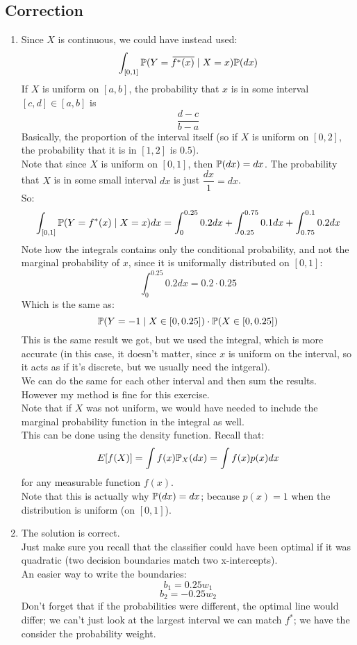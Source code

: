 \documentclass[12pt]{article}
\begin{document}
\begingroup
\color{red}
\subsection*{Correction}
\begin{enumerate}[label=\alph*)]
    \item
    Since $X$ is continuous,
    we could have instead used:
    \[ \int_{[0, 1]} 
    \mathbb{P}(Y = \,\overline{\!{f^*(x)}} \mid X = x) \mathbb{P}(dx) \]
    If $X$ is uniform on $[a, b]$, the probability that
    $x$ is in some interval $[c, d] \in [a, b]$ is
    \[ \dfrac{d-c}{b-a} \]
    Basically, the proportion of the interval itself
    (so if $X$ is uniform on $[0, 2]$,
    the probability that it is in $[1, 2]$
    is $0.5$). \\
    Note that since $X$ is uniform on $[0, 1]$,
    then $\mathbb{P}(dx) = dx$.
    The probability that $X$ is in some small interval $dx$
    is just $\dfrac{dx}{1} = dx$. \\
    So:
    \[ \int_{[0, 1]} 
    \mathbb{P}(Y = f^*(x) \mid X = x) dx =
    \int_0^{0.25} 0.2 dx
    + \int_{0.25}^{0.75} 0.1 dx
    +\int_{0.75}^{0.1} 0.2 dx \]
    Note how the integrals contains
    only the conditional probability,
    and not the marginal probability of $x$,
    since it is uniformally distributed
    on $[0, 1]$:
    \[ \int_0^{0.25} 0.2 dx = 0.2 \cdot 0.25 \]
    Which is the same as:
    \[ \mathbb{P}(Y = -1 \mid X \in [0, 0.25]) 
    \cdot \mathbb{P}(X \in [0, 0.25]) \]
    This is the same result we got,
    but we used the integral, which is more accurate
    (in this case, it doesn't matter,
    since $x$ is uniform on the interval,
    so it acts as if it's discrete,
    but we usually need the intgeral). \\
    We can do the same for each other interval
    and then sum the results. \\
    However my method is fine for this exercise. \\
    Note that if $X$ was not uniform,
    we would have needed to include the marginal
    probability function in the integral
    as well. \\
    This can be done using
    the density function. Recall that:
    \[ E[f(X)] = \int f(x)\mathbb{P}_X(dx) 
    = \int f(x) p(x)dx \]
    for any measurable function $f(x)$. \\
    Note that this is actually why $\mathbb{P}(dx) = dx$;
    because $p(x) = 1$ when the distribution
    is uniform (on $[0, 1]$). \\
    \item 
    The solution is correct. \\
    Just make sure you recall that the
    classifier could have been optimal if it
    was quadratic (two decision boundaries
    match two x-intercepts). \\
    An easier way to write the boundaries:
    \[ b_1 = 0.25w_1 \]
    \[ b_2 = -0.25w_2 \]
    Don't forget that if the probabilities were
    different,
    the optimal line would differ;
    we can't just look at the largest interval
    we can match $f^*$; we have the consider
    the probability weight.
\end{enumerate}
\endgroup
\end{document}
